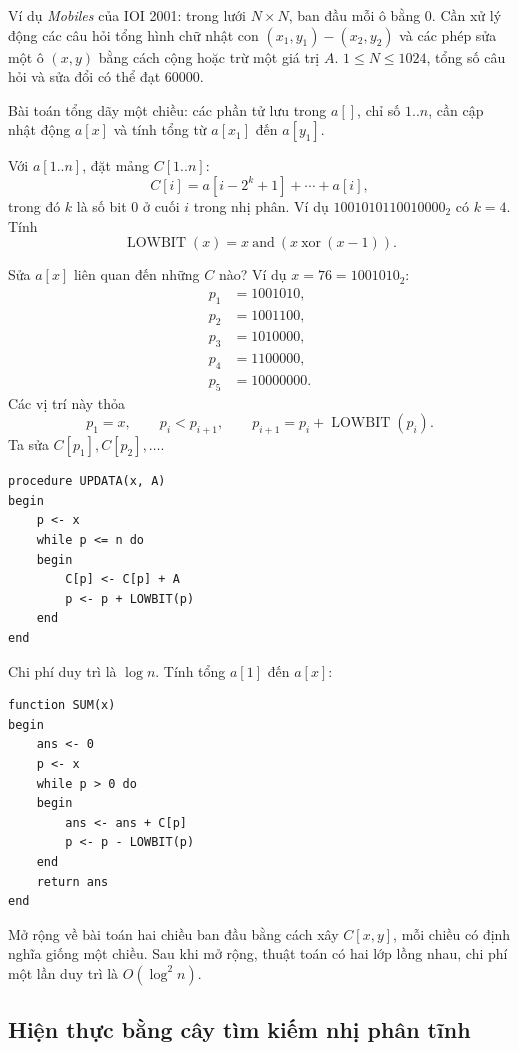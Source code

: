 \documentclass[11pt]{article}
\begin{document}
Ví dụ \textit{Mobiles} của IOI 2001: trong lưới \(N\times N\), ban đầu mỗi ô
bằng \(0\). Cần xử lý động các câu hỏi tổng hình chữ nhật con
\((x_1,y_1)-(x_2,y_2)\) và các phép sửa một ô \((x,y)\) bằng cách cộng hoặc
trừ một giá trị \(A\). \(1\le N\le 1024\), tổng số câu hỏi và sửa đổi có thể
đạt \(60000\).

Bài toán tổng dãy một chiều: các phần tử lưu trong \(a[]\), chỉ số \(1..n\),
cần cập nhật động \(a[x]\) và tính tổng từ \(a[x_1]\) đến \(a[y_1]\).

Với \(a[1..n]\), đặt mảng \(C[1..n]\):
\[
  C[i]=a[i-2^k+1]+\cdots+a[i],
\]
trong đó \(k\) là số bit \(0\) ở cuối \(i\) trong nhị phân. Ví dụ
\(1001010110010000_2\) có \(k=4\). Tính
\[
  \operatorname{LOWBIT}(x)=x\ \mathrm{and}\ (x\ \mathrm{xor}\ (x-1)).
\]

Sửa \(a[x]\) liên quan đến những \(C\) nào? Ví dụ \(x=76=1001010_2\):
\[
\begin{aligned}
p_1&=1001010,\\
p_2&=1001100,\\
p_3&=1010000,\\
p_4&=1100000,\\
p_5&=10000000.
\end{aligned}
\]
Các vị trí này thỏa
\[
  p_1=x,\qquad p_i<p_{i+1},\qquad
  p_{i+1}=p_i+\operatorname{LOWBIT}(p_i).
\]
Ta sửa \(C[p_1],C[p_2],\ldots\).

\begin{verbatim}
procedure UPDATA(x, A)
begin
    p <- x
    while p <= n do
    begin
        C[p] <- C[p] + A
        p <- p + LOWBIT(p)
    end
end
\end{verbatim}

Chi phí duy trì là \(\log n\). Tính tổng \(a[1]\) đến \(a[x]\):

\begin{verbatim}
function SUM(x)
begin
    ans <- 0
    p <- x
    while p > 0 do
    begin
        ans <- ans + C[p]
        p <- p - LOWBIT(p)
    end
    return ans
end
\end{verbatim}

Mở rộng về bài toán hai chiều ban đầu bằng cách xây \(C[x,y]\), mỗi chiều có
định nghĩa giống một chiều. Sau khi mở rộng, thuật toán có hai lớp lồng nhau,
chi phí một lần duy trì là \(O(\log^2 n)\).

\subsection{Hiện thực bằng cây tìm kiếm nhị phân tĩnh}
\end{document}
